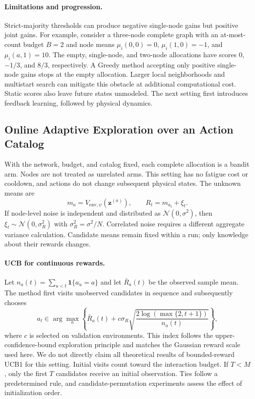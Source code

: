 \documentclass[a4paper,11pt]{article}
\newcommand{\ind}{\mathbf 1}
\numberwithin{equation}{section}
\begin{document}
\paragraph{Limitations and progression.}
Strict-majority thresholds can produce negative single-node gains but positive joint gains. For example, consider a three-node complete graph with an at-most-count budget $B=2$ and node means $\mu_i(0,0)=0$, $\mu_i(1,0)=-1$, and $\mu_i(a,1)=10$. The empty, single-node, and two-node allocations have scores $0$, $-1/3$, and $8/3$, respectively. A Greedy method accepting only positive single-node gains stops at the empty allocation. Larger local neighborhoods and multistart search can mitigate this obstacle at additional computational cost. Static scores also leave future states unmodeled. The next setting first introduces feedback learning, followed by physical dynamics.

\subsection{Online Adaptive Exploration over an Action Catalog}
\label{sec:bandit}
With the network, budget, and catalog fixed, each complete allocation is a bandit arm. Nodes are not treated as unrelated arms. This setting has no fatigue cost or cooldown, and actions do not change subsequent physical states. The unknown means are
\begin{equation}
m_a=V_{\mathrm{env},\psi}(\mathbf z^{(a)}),\qquad R_t=m_{a_t}+\xi_t.
\end{equation}
If node-level noise is independent and distributed as $\mathcal N(0,\sigma^2)$, then $\xi_t\sim\mathcal N(0,\sigma_R^2)$ with $\sigma_R^2=\sigma^2/N$. Correlated noise requires a different aggregate variance calculation. Candidate means remain fixed within a run; only knowledge about their rewards changes.

\paragraph{UCB for continuous rewards.}
Let $n_a(t)=\sum_{u<t}\ind\{a_u=a\}$ and let $\bar R_a(t)$ be the observed sample mean. The method first visits unobserved candidates in sequence and subsequently chooses
\begin{equation}
a_t\in\arg\max_a\left\{\bar R_a(t)+c\sigma_R
\sqrt{\frac{2\log(\max\{2,t+1\})}{n_a(t)}}\right\},
\label{eq:ucb}
\end{equation}
where $c$ is selected on validation environments. This index follows the upper-confidence-bound exploration principle\citep{auer2002} and matches the Gaussian reward scale used here. We do not directly claim all theoretical results of bounded-reward UCB1 for this setting. Initial visits count toward the interaction budget. If $T<M$, only the first $T$ candidates receive an initial observation. Ties follow a predetermined rule, and candidate-permutation experiments assess the effect of initialization order.
\end{document}
